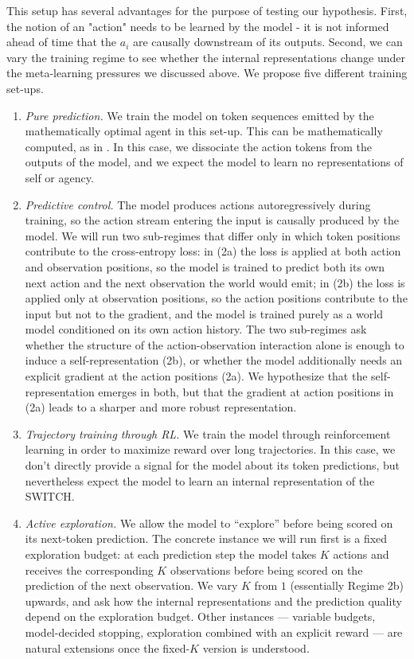 \documentclass[11pt]{article}
\begin{document}
This setup has several advantages for the purpose of testing our hypothesis. First, the notion of an "action" needs to be learned by the model - it is not informed ahead of time that the $a_i$ are causally downstream of its outputs. Second, we can vary the training regime to see whether the internal representations change under the meta-learning pressures we discussed above. We propose five different training set-ups.

\begin{enumerate}
    \item \emph{Pure prediction.} We train the model on token sequences emitted by the mathematically optimal agent in this set-up. This can be mathematically computed, as in \citet{shai2024belief}. In this case, we dissociate the action tokens from the outputs of the model, and we expect the model to learn no representations of self or agency.
    \item \emph{Predictive control.} The model produces actions autoregressively during training, so the action stream entering the input is causally produced by the model. We will run two sub-regimes that differ only in which token positions contribute to the cross-entropy loss: in (2a) the loss is applied at both action and observation positions, so the model is trained to predict both its own next action and the next observation the world would emit; in (2b) the loss is applied only at observation positions, so the action positions contribute to the input but not to the gradient, and the model is trained purely as a world model conditioned on its own action history. The two sub-regimes ask whether the structure of the action-observation interaction alone is enough to induce a self-representation (2b), or whether the model additionally needs an explicit gradient at the action positions (2a). We hypothesize that the self-representation emerges in both, but that the gradient at action positions in (2a) leads to a sharper and more robust representation.
    \item \emph{Trajectory training through RL.} We train the model through reinforcement learning in order to maximize reward over long trajectories. In this case, we don't directly provide a signal for the model about its token predictions, but nevertheless expect the model to learn an internal representation of the SWITCH.
    \item \emph{Active exploration.} We allow the model to ``explore'' before being scored on its next-token prediction. The concrete instance we will run first is a fixed exploration budget: at each prediction step the model takes $K$ actions and receives the corresponding $K$ observations before being scored on the prediction of the next observation. We vary $K$ from $1$ (essentially Regime 2b) upwards, and ask how the internal representations and the prediction quality depend on the exploration budget. Other instances --- variable budgets, model-decided stopping, exploration combined with an explicit reward --- are natural extensions once the fixed-$K$ version is understood.

\end{enumerate}
\end{document}
